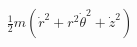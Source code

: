 \documentclass[preview]{standalone}
\begin{document}
\begin{align*}
\frac 12m(\dot{r}^2+r^2\dot{\theta}^2+\dot{z}^2)
\end{align*}
\end{document}
